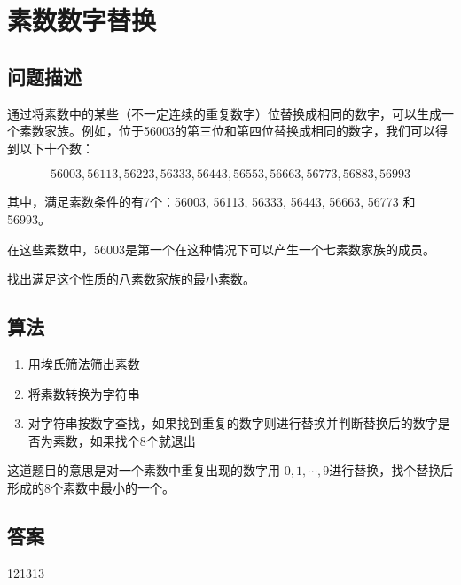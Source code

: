 \section{素数数字替换}\label{sec:problem51}
\subsection{问题描述}
\begin{tcolorbox}
	通过将素数中的某些（不一定连续的重复数字）位替换成相同的数字，可以生成一个素数家族。例如，位于56003的第三位和第四位替换成相同的数字，我们可以得到以下十个数：

	\[
		56003, 56113, 56223, 56333, 56443, 56553, 56663, 56773, 56883, 56993
	\]

	其中，满足素数条件的有7个：56003, 56113, 56333, 56443, 56663, 56773 和 56993。

	在这些素数中，56003是第一个在这种情况下可以产生一个七素数家族的成员。

	找出满足这个性质的八素数家族的最小素数。
\end{tcolorbox}

\subsection{算法}
\begin{enumerate}
	\item 用埃氏筛法筛出素数
	\item 将素数转换为字符串
	\item 对字符串按数字查找，如果找到重复的数字则进行替换并判断替换后的数字是否为素数，如果找个8个就退出
\end{enumerate}

这道题目的意思是对一个素数中重复出现的数字用 \( 0,1,\cdots, 9 \)进行替换，找个替换后形成的8个素数中最小的一个。

\subsection{答案}
121313
